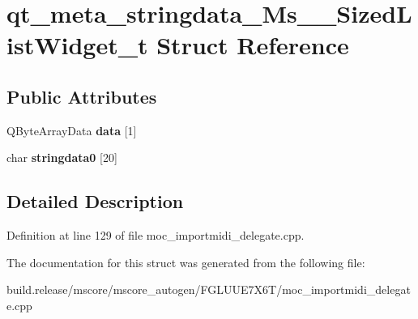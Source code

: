\hypertarget{structqt__meta__stringdata___ms_____sized_list_widget__t}{}\section{qt\+\_\+meta\+\_\+stringdata\+\_\+\+Ms\+\_\+\+\_\+\+Sized\+List\+Widget\+\_\+t Struct Reference}
\label{structqt__meta__stringdata___ms_____sized_list_widget__t}
\subsection*{Public Attributes}
\begin{DoxyCompactItemize}
\item 
\mbox{\label{structqt__meta__stringdata___ms_____sized_list_widget__t_a8f7251a7036ab1acffc327334218f4b5}} 
Q\+Byte\+Array\+Data {\bfseries data} \mbox{[}1\mbox{]}
\item 
\mbox{\label{structqt__meta__stringdata___ms_____sized_list_widget__t_ae1db960a5d9dde64c3ec0f00763bdf64}} 
char {\bfseries stringdata0} \mbox{[}20\mbox{]}
\end{DoxyCompactItemize}


\subsection{Detailed Description}


Definition at line 129 of file moc\+\_\+importmidi\+\_\+delegate.\+cpp.



The documentation for this struct was generated from the following file\+:\begin{DoxyCompactItemize}
\item 
build.\+release/mscore/mscore\+\_\+autogen/\+F\+G\+L\+U\+U\+E7\+X6\+T/moc\+\_\+importmidi\+\_\+delegate.\+cpp\end{DoxyCompactItemize}
